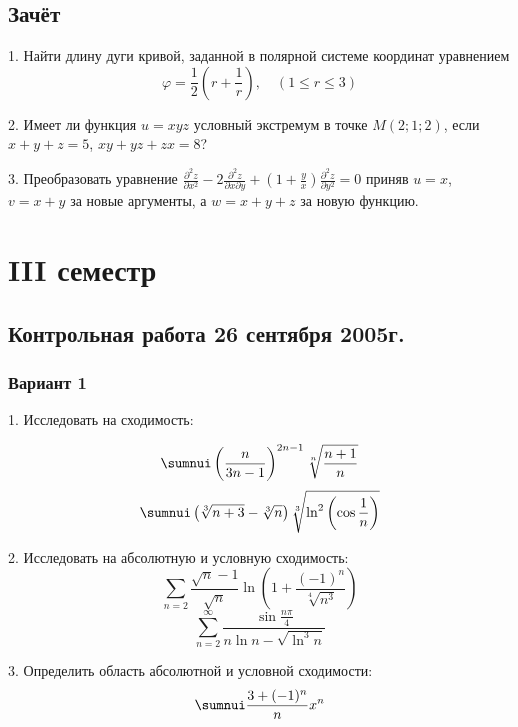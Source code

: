 \documentclass[a4paper]{article}
\begin{document}
\subsection{Зачёт }

1. Найти длину дуги кривой, заданной в полярной системе координат
уравнением
$$
\varphi =\frac{1}{2}\left(r+\frac{1}{r}\right),\quad (1\le r\le
3)
$$

2. Имеет ли функция $u=xyz$ условный экстремум в точке $M(2;1;2)$,
если $x+y+z=5$, $xy+yz+zx=8$?

3. Преобразовать уравнение $\displaystyle
\frac{\partial^2z}{\partial x^2}-2\frac{\partial^2z}{\partial
x\partial y}+\left(1+\frac{y}{x}\right)\frac{\partial^2z}{\partial
y^2}=0$ приняв $u=x$, $v=x+y$ за новые аргументы, а $w=x+y+z$ за
новую функцию.

\section{III семестр}

\subsection{Контрольная работа 26 сентября 2005г.}

\subsubsection{Вариант 1}


1. Исследовать на сходимость:

$$
\sumnui\left(\frac{n}{3n-1}\right)^{2n-1}\sqrt[n]{\frac{n+1}{n}}
$$
$$
\sumnui\left(\sqrt[3]{n+3}-\sqrt[3]{n}\right)\sqrt[3]{\ln^2\left(\cos\frac{1}{n}\right)}
$$

2. Исследовать на абсолютную и условную сходимость:
$$
\sum_{n=2}\frac{\sqrt{n}-1}{\sqrt{n}}\ln\left(1+\frac{(-1)^n}{\sqrt[4]{n^3}}\right)
$$
$$
\sum_{n=2}^\infty\frac{\sin\frac{n\pi}{4}}{n\ln n-\sqrt{\ln^3n}}
$$

3. Определить область абсолютной и условной сходимости:
$$
\sumnui\frac{3+(-1)^n}{n}x^n
$$
\end{document}
